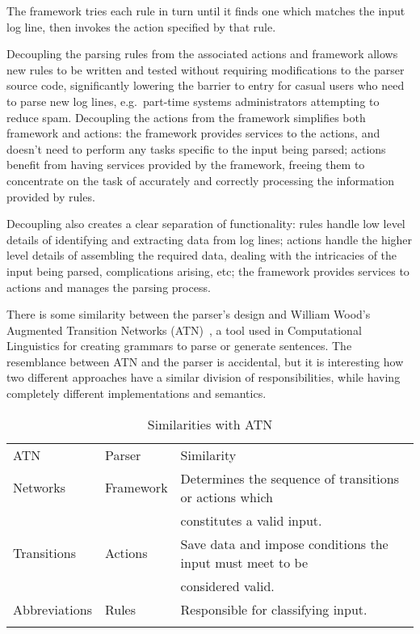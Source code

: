 \documentclass[draft]{svmult}
\begin{document}
The framework tries each rule in turn until it finds one which matches the
input log line, then invokes the action specified by that rule.

Decoupling the parsing rules from the associated actions and framework
allows new rules to be written and tested without requiring modifications
to the parser source code, significantly lowering the barrier to entry for
casual users who need to parse new log lines, e.g.\ part-time systems
administrators attempting to reduce spam.  Decoupling the actions from the
framework simplifies both framework and actions: the framework provides
services to the actions, and doesn't need to perform any tasks specific to
the input being parsed; actions benefit from having services provided by
the framework, freeing them to concentrate on the task of accurately and
correctly processing the information provided by rules.

Decoupling also creates a clear separation of functionality: rules handle
low level details of identifying and extracting data from log lines;
actions handle the higher level details of assembling the required data,
dealing with the intricacies of the input being parsed, complications
arising, etc; the framework provides services to actions and manages the
parsing process.

There is some similarity between the parser's design and William Wood's
Augmented Transition Networks (ATN)~\cite{atns, nlpip}, a tool used in
Computational Linguistics for creating grammars to parse or generate
sentences.  The resemblance between ATN and the parser is accidental, but
it is interesting how two different approaches have a similar division of
responsibilities, while having completely different implementations and
semantics.


\begin{table}[ht]
    \caption{Similarities with ATN}\label{Similarities with ATN}
    \begin{tabular}[]{lll}
        \hline
        \noalign{\smallskip}
        ATN           & Parser    & Similarity                          \\
        \noalign{\smallskip}
        \hline
        \noalign{\smallskip}
        Networks      & Framework & Determines the sequence of
                                    transitions or actions which        \\
                      &           & constitutes a valid input.          \\
        Transitions   & Actions   & Save data and impose conditions the
                                    input must meet to be               \\
                      &           & considered valid.                   \\
        Abbreviations & Rules     & Responsible for classifying input.  \\
        \noalign{\smallskip}
        \hline
        \noalign{\smallskip}
    \end{tabular}
\end{table}
\end{document}
